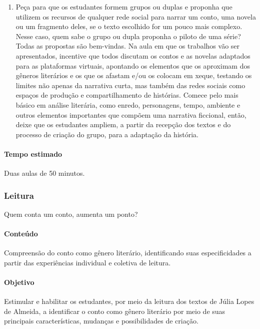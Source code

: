 \documentclass[12pt]{extarticle}
\begin{document}
\begin{enumerate}
\item
Peça para que os estudantes formem grupos ou duplas e proponha que
utilizem os recursos de qualquer rede social para narrar um conto, uma
novela ou um fragmento deles, se o texto escolhido for um pouco mais
complexo. Nesse caso, quem sabe o grupo ou dupla proponha o piloto de
uma série? Todas as propostas são bem-vindas. Na aula em que os
trabalhos vão ser apresentados, incentive que todos discutam os contos e
as novelas adaptados para as plataformas virtuais, apontando os
elementos que os aproximam dos gêneros literários e os que os afastam
e/ou os colocam em xeque, testando os limites não apenas da narrativa
curta, mas também das redes sociais como espaços de produção e
compartilhamento de histórias. Comece pelo mais básico em análise
literária, como enredo, personagens, tempo, ambiente e outros elementos
importantes que compõem uma narrativa ficcional, então, deixe que os
estudantes ampliem, a partir da recepção dos textos e do processo de
criação do grupo, para a adaptação da história.
\end{enumerate}

\paragraph{Tempo estimado} Duas aulas de 50 minutos.




\subsubsection{Leitura} Quem conta um conto, aumenta um ponto?




\paragraph{Conteúdo} Compreensão do conto como gênero literário,
identificando suas especificidades a partir das experiências individual
e coletiva de leitura.

\paragraph{Objetivo} Estimular e habilitar os estudantes, por meio da
leitura dos textos de Júlia Lopes de Almeida, a identificar o conto como
gênero literário por meio de suas principais características, mudanças e
possibilidades de criação.
\end{document}
